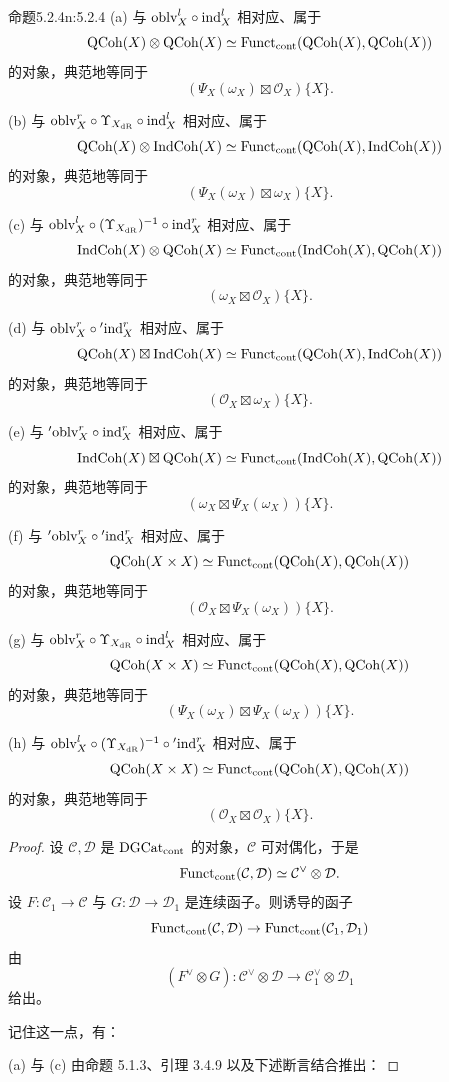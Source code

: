 \begin{othm}{命题}{5.2.4}{n:5.2.4}
(a) 与 $\mathrm{oblv}^l_X\circ\mathrm{ind}^l_X$ 相对应、属于
\[
\mathrm{QCoh}(X)\otimes\mathrm{QCoh}(X)\simeq\mathrm{Funct}_{\mathrm{cont}}(\mathrm{QCoh}(X),\mathrm{QCoh}(X))
\]
的对象，典范地等同于
\[
(\Psi_X(\omega_X)\boxtimes\mathcal{O}_X)\{X\}.
\]

(b) 与 $\mathrm{oblv}^r_X\circ\Upsilon_{X_{\mathrm{dR}}}\circ\mathrm{ind}^l_X$ 相对应、属于
\[
\mathrm{QCoh}(X)\otimes\mathrm{IndCoh}(X)\simeq\mathrm{Funct}_{\mathrm{cont}}(\mathrm{QCoh}(X),\mathrm{IndCoh}(X))
\]
的对象，典范地等同于
\[
(\Psi_X(\omega_X)\boxtimes\omega_X)\{X\}.
\]

(c) 与 $\mathrm{oblv}^l_X\circ(\Upsilon_{X_{\mathrm{dR}}})^{-1}\circ\mathrm{ind}^r_X$ 相对应、属于
\[
\mathrm{IndCoh}(X)\otimes\mathrm{QCoh}(X)\simeq\mathrm{Funct}_{\mathrm{cont}}(\mathrm{IndCoh}(X),\mathrm{QCoh}(X))
\]
的对象，典范地等同于
\[
(\omega_X\boxtimes\mathcal{O}_X)\{X\}.
\]

(d) 与 $\mathrm{oblv}^r_X\circ{}'\mathrm{ind}^r_X$ 相对应、属于
\[
\mathrm{QCoh}(X)\boxtimes\mathrm{IndCoh}(X)\simeq\mathrm{Funct}_{\mathrm{cont}}(\mathrm{QCoh}(X),\mathrm{IndCoh}(X))
\]
的对象，典范地等同于
\[
(\mathcal{O}_X\boxtimes\omega_X)\{X\}.
\]

(e) 与 ${}'\mathrm{oblv}^r_X\circ\mathrm{ind}^r_X$ 相对应、属于
\[
\mathrm{IndCoh}(X)\boxtimes\mathrm{QCoh}(X)\simeq\mathrm{Funct}_{\mathrm{cont}}(\mathrm{IndCoh}(X),\mathrm{QCoh}(X))
\]
的对象，典范地等同于
\[
(\omega_X\boxtimes\Psi_X(\omega_X))\{X\}.
\]

(f) 与 ${}'\mathrm{oblv}^r_X\circ{}'\mathrm{ind}^r_X$ 相对应、属于
\[
\mathrm{QCoh}(X\times X)\simeq\mathrm{Funct}_{\mathrm{cont}}(\mathrm{QCoh}(X),\mathrm{QCoh}(X))
\]
的对象，典范地等同于
\[
(\mathcal{O}_X\boxtimes\Psi_X(\omega_X))\{X\}.
\]

(g) 与 $\mathrm{oblv}^r_X\circ\Upsilon_{X_{\mathrm{dR}}}\circ\mathrm{ind}^l_X$ 相对应、属于
\[
\mathrm{QCoh}(X\times X)\simeq\mathrm{Funct}_{\mathrm{cont}}(\mathrm{QCoh}(X),\mathrm{QCoh}(X))
\]
的对象，典范地等同于
\[
(\Psi_X(\omega_X)\boxtimes\Psi_X(\omega_X))\{X\}.
\]

(h) 与 $\mathrm{oblv}^l_X\circ(\Upsilon_{X_{\mathrm{dR}}})^{-1}\circ{}'\mathrm{ind}^r_X$ 相对应、属于
\[
\mathrm{QCoh}(X\times X)\simeq\mathrm{Funct}_{\mathrm{cont}}(\mathrm{QCoh}(X),\mathrm{QCoh}(X))
\]
的对象，典范地等同于
\[
(\mathcal{O}_X\boxtimes\mathcal{O}_X)\{X\}.
\]
\end{othm}

\begin{proof}
设 $\mathcal{C},\mathcal{D}$ 是 $\mathrm{DGCat}_{\mathrm{cont}}$ 的对象，$\mathcal{C}$ 可对偶化，于是
\[
\mathrm{Funct}_{\mathrm{cont}}(\mathcal{C},\mathcal{D})\simeq\mathcal{C}^{\vee}\otimes\mathcal{D}.
\]
设 $F:\mathcal{C}_1\to\mathcal{C}$ 与 $G:\mathcal{D}\to\mathcal{D}_1$ 是连续函子。则诱导的函子
\[
\mathrm{Funct}_{\mathrm{cont}}(\mathcal{C},\mathcal{D})\to\mathrm{Funct}_{\mathrm{cont}}(\mathcal{C}_1,\mathcal{D}_1)
\]
由
\[
(F^{\vee}\otimes G):\mathcal{C}^{\vee}\otimes\mathcal{D}\to\mathcal{C}_1^{\vee}\otimes\mathcal{D}_1
\]
给出。

记住这一点，有：

(a) 与 (c) 由命题 5.1.3、引理 3.4.9 以及下述断言结合推出：
\end{proof}

